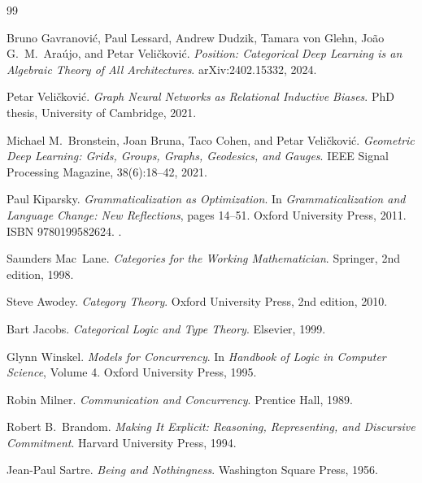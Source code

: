 \documentclass[11pt]{article}
\begin{document}
\newpage
\begin{thebibliography}{99}

Bruno Gavranović, Paul Lessard, Andrew Dudzik, Tamara von Glehn,
João G.~M.~Araújo, and Petar Veličković.
\newblock \emph{Position: Categorical Deep Learning is an Algebraic Theory of All Architectures}.
\newblock arXiv:2402.15332, 2024.

Petar Veličković.
\newblock \emph{Graph Neural Networks as Relational Inductive Biases}.
\newblock PhD thesis, University of Cambridge, 2021.

Michael M.~Bronstein, Joan Bruna, Taco Cohen, and Petar Veličković.
\newblock \emph{Geometric Deep Learning: Grids, Groups, Graphs, Geodesics, and Gauges}.
\newblock IEEE Signal Processing Magazine, 38(6):18--42, 2021.

Paul Kiparsky.
\newblock \emph{Grammaticalization as Optimization}.
\newblock In \emph{Grammaticalization and Language Change: New Reflections},
pages 14--51.
\newblock Oxford University Press, 2011.
\newblock ISBN 9780199582624.
\newblock {}.


Saunders Mac~Lane.
\newblock \emph{Categories for the Working Mathematician}.
\newblock Springer, 2nd edition, 1998.

Steve Awodey.
\newblock \emph{Category Theory}.
\newblock Oxford University Press, 2nd edition, 2010.

Bart Jacobs.
\newblock \emph{Categorical Logic and Type Theory}.
\newblock Elsevier, 1999.

Glynn Winskel.
\newblock \emph{Models for Concurrency}.
\newblock In \emph{Handbook of Logic in Computer Science}, Volume 4.
\newblock Oxford University Press, 1995.

Robin Milner.
\newblock \emph{Communication and Concurrency}.
\newblock Prentice Hall, 1989.

Robert B.~Brandom.
\newblock \emph{Making It Explicit: Reasoning, Representing, and Discursive Commitment}.
\newblock Harvard University Press, 1994.

Jean-Paul Sartre.
\newblock \emph{Being and Nothingness}.
\newblock Washington Square Press, 1956.


\end{thebibliography}
\end{document}

